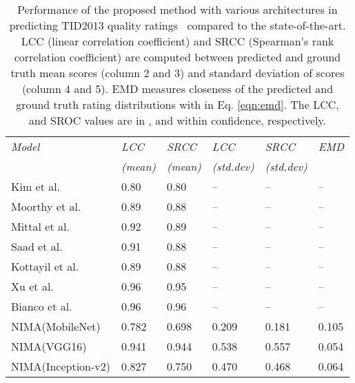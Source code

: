 \documentclass[10pt,twocolumn,twoside]{IEEEtran}
\begin{document}
\begin{table}[!t]
\vspace{0 mm}
\begin{center}
\captionsetup{width=0.49\textwidth}
\caption{Performance of the proposed method with various architectures in predicting TID2013 quality ratings~\cite{ponomarenko2013color} compared to the state-of-the-art. LCC (linear correlation coefficient) and SRCC (Spearman's rank correlation coefficient) are computed between predicted and ground truth mean scores (column 2 and 3) and standard deviation of scores (column 4 and 5). EMD measures closeness of the predicted and ground truth rating distributions with  in Eq. \ref{eqn:emd}. The LCC, and SROC values are in  , and  within  confidence, respectively.}
\begin{tabular}{@{} *6l @{}}    \toprule
\emph{Model} & \emph{LCC} & \emph{SRCC} & \emph{LCC} & \emph{SRCC} & \emph{EMD} \\
  & \emph{(mean)} & \emph{(mean)} & \emph{(std.dev)} & \emph{(std.dev)}\\\midrule
 Kim et al.  \cite{kim2017deep} & 0.80 & 0.80 & -- & -- & -- \\
Moorthy et al. \cite{moorthy2011blind}    &  0.89  &  0.88 &  --  &  -- &  --   \\ 
Mittal et al. \cite{mittal2012no}    &  0.92  &  0.89  &  --  &  --  &  --  \\ 
Saad et al. \cite{saad2012blind}   &  0.91  &  0.88  &  --  &  --  &  --  \\ 
Kottayil et al. \cite{kottayil2016color}    &  0.89  &  0.88  &  --  &  --  &  --  \\ 
Xu et al. \cite{xu2016blind}    &  0.96  &  0.95  &  --  &  -- &  --   \\ 
Bianco et al. \cite{bianco2016use}   &  0.96  &  0.96  &  --  &  --  &  --  \\ \hdashline
NIMA(MobileNet)  & 0.782 & 0.698 &  0.209 &  0.181 &  0.105 \\
NIMA(VGG16)  & 0.941& 0.944 &  0.538 &  0.557 &  0.054 \\
NIMA(Inception-v2)  & 0.827 & 0.750 &  0.470 &  0.468 &  0.064 \\\bottomrule
 \hline
\end{tabular}
\label{tab:tid_comp}
\end{center}
\vspace{-5 mm}
\end{table}
\end{document}
